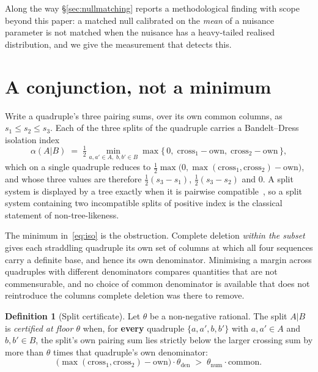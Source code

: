 \documentclass[11pt,a4paper]{article}
\theoremstyle{definition}
\newtheorem{definition}[theorem]{Definition}
\theoremstyle{remark}
\begin{document}
Along the way \S\ref{sec:nullmatching} reports a methodological finding with
scope beyond this paper: a matched null calibrated on the \emph{mean} of a
nuisance parameter is not matched when the nuisance has a heavy-tailed realised
distribution, and we give the measurement that detects this.

\section{A conjunction, not a minimum}\label{sec:conjunction}

Write a quadruple's three pairing sums, over its own common columns, as $s_1 \le
s_2 \le s_3$. Each of the three splits of the quadruple carries a Bandelt--Dress
isolation index~\cite{bandeltdress}
\begin{equation}\label{eq:iso}
  \alpha(A|B) \;=\; \tfrac12 \min_{a,a' \in A,\; b,b' \in B}
    \max\{\,0,\; \mathrm{cross}_1 - \mathrm{own},\; \mathrm{cross}_2 - \mathrm{own}\,\},
\end{equation}
which on a single quadruple reduces to
$\tfrac12\max\bigl(0, \max(\mathrm{cross}_1,\mathrm{cross}_2) - \mathrm{own}\bigr)$,
and whose three values are therefore $\tfrac12(s_3-s_1)$, $\tfrac12(s_3-s_2)$ and
$0$. A split system is displayed by a tree exactly when it is pairwise
compatible~\cite{semplesteel}, so a split system containing two incompatible
splits of positive index is the classical statement of non-tree-likeness.

The minimum in~\eqref{eq:iso} is the obstruction. Complete deletion
\emph{within the subset} gives each straddling quadruple its own set of columns
at which all four sequences carry a definite base, and hence its own
denominator. Minimising a margin across quadruples with different denominators
compares quantities that are not commensurable, and no choice of common
denominator is available that does not reintroduce the columns complete deletion
was there to remove.

\begin{definition}[Split certificate]\label{def:split}
Let $\theta$ be a non-negative rational. The split $A|B$ is \emph{certified at
floor $\theta$} when, for \textbf{every} quadruple $\{a,a',b,b'\}$ with $a,a' \in
A$ and $b,b' \in B$, the split's own pairing sum lies strictly below the larger
crossing sum by more than $\theta$ times that quadruple's own denominator:
\[
  \bigl(\max(\mathrm{cross}_1,\mathrm{cross}_2) - \mathrm{own}\bigr) \cdot \theta_{\mathrm{den}}
  \;>\; \theta_{\mathrm{num}} \cdot \mathrm{common}.
\]
\end{definition}
\end{document}
